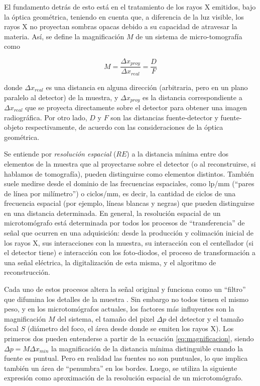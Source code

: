 El fundamento detrás de esto está en el tratamiento de los rayos X emitidos, bajo la
óptica geométrica, teniendo en cuenta que, a diferencia de la luz visible, los rayos X no proyectan sombras opacas debido a
su capacidad de atravesar la materia. Así, se define la magnificación $M$ de un sistema
de micro-tomografía como

\begin{equation}
    M = \frac{\Delta x_{proy}}{\Delta x_{real}} = \frac{D}{F}
    \label{eq:magnificacion}
\end{equation}

\noindent donde $\Delta x_{real}$ es una distancia en alguna dirección (arbitraria, pero en un
plano paralelo al detector) de la muestra, y $\Delta x_{proy}$ es la distancia correspondiente
a $\Delta x_{real}$ que se proyecta directamente sobre el detector para obtener
una imagen radiográfica. Por otro lado, $D$ y $F$ son las distancias fuente-detector
y fuente-objeto respectivamente, de acuerdo con las consideraciones de la óptica geométrica.

Se entiende por \textit{resolución espacial} ($RE$) a la distancia mínima entre dos elementos de la muestra
que al proyectarse sobre el detector (o al reconstruirse, si hablamos de tomografía),
pueden distinguirse como elementos distintos. También suele medirse desde el dominio de
las frecuencias espaciales, como lp/mm (``pares de línea por milímetro'') o ciclos/mm,
es decir, la cantidad de ciclos de una frecuencia espacial (por ejemplo, líneas blancas
y negras) que pueden distinguirse en una distancia determinada. En general, la resolución espacial de un microtomógrafo
está determinada por todos los procesos de ``transferencia'' de señal que ocurren en una
adquisición: desde la producción y colimación inicial de los rayos X, sus interacciones
con la muestra, su interacción con el centellador (si el detector tiene) e interacción con los foto-diodos, el proceso de transformación
a una señal eléctrica, la digitalización de esta misma, y el algoritmo de reconstrucción.

Cada uno de estos procesos altera la señal original y funciona como un ``filtro'' que
difumina los detalles de la muestra \cite{Buzug2008}. Sin embargo no todos tienen el mismo peso, y en
los microtomógrafos actuales, los factores más influyentes son la magnificación $M$ del
sistema, el tamaño del pixel $\Delta p$ del detector y el tamaño focal $S$ (diámetro del foco,
el área desde donde se emiten los rayos X).
Los primeros dos pueden entenderse a partir de la ecuación \ref{eq:magnificacion}, siendo
$\Delta p = M \Delta x_{min}$ la magnificación de la distancia mínima distinguible cuando
la fuente es puntual. Pero en realidad las fuentes no son puntuales, lo que implica también un
área de ``penumbra'' en los bordes. Luego, se utiliza la siguiente expresión como aproximación
de la resolución espacial de un microtomógrafo. \cite{JunYan2010}

